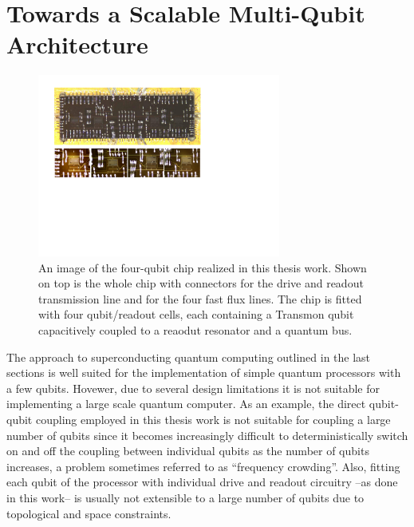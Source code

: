 \section{Towards a Scalable Multi-Qubit Architecture}

\begin{figure}
	\centering
	\includegraphics[width=8cm]{./material/figures/scalable-architecture/scalable_architecture_photo}
	\caption[An optical image of the four-qubit chip realized in this work]{An image of the four-qubit chip realized in this thesis work. Shown on top is the whole chip with connectors for the drive and readout transmission line and for the four fast flux lines. The chip is fitted with four qubit/readout cells, each containing a Transmon qubit capacitively coupled to a reaodut resonator and a quantum bus.}
	\label{fig:scalable_architecture_photo}
\end{figure}

The approach to superconducting quantum computing outlined in the last sections is well suited for the implementation of simple quantum processors with a few qubits. Hovewer, due to several design limitations it is not suitable for implementing a large scale quantum computer. As an example, the direct qubit-qubit coupling employed in this thesis work is not suitable for coupling a large number of qubits since it becomes increasingly difficult to deterministically switch on and off the coupling between individual qubits as the number of qubits increases, a problem sometimes referred to as ``frequency crowding''. Also, fitting each qubit of the processor with individual drive and readout circuitry --as done in this work-- is usually not extensible to a large number of qubits due to topological and space constraints. 

\smallskip

